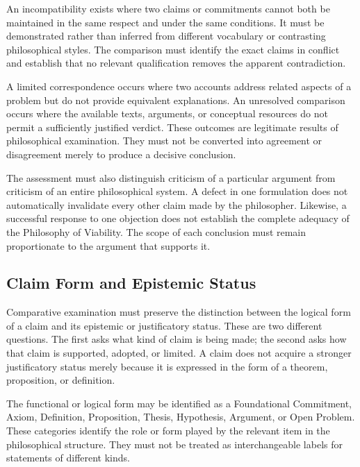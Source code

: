 \label{para:VS.B01.P01.C08.S01.SS06.P004}
An incompatibility exists where two claims or
commitments cannot both be maintained in the same
respect and under the same conditions. It must be
demonstrated rather than inferred from different
vocabulary or contrasting philosophical styles. The
comparison must identify the exact claims in conflict
and establish that no relevant qualification removes
the apparent contradiction.

\label{para:VS.B01.P01.C08.S01.SS06.P005}
A limited correspondence occurs where two accounts
address related aspects of a problem but do not provide
equivalent explanations. An unresolved comparison occurs
where the available texts, arguments, or conceptual
resources do not permit a sufficiently justified
verdict. These outcomes are legitimate results of
philosophical examination. They must not be converted
into agreement or disagreement merely to produce a
decisive conclusion.

\label{para:VS.B01.P01.C08.S01.SS06.P006}
The assessment must also distinguish criticism of a
particular argument from criticism of an entire
philosophical system. A defect in one formulation does
not automatically invalidate every other claim made
by the philosopher. Likewise, a successful response
to one objection does not establish the complete
adequacy of the Philosophy of Viability. The scope of
each conclusion must remain proportionate to the
argument that supports it.

\subsection{Claim Form and Epistemic Status}
\label{sec:ch08-s01-ss07}

\label{para:VS.B01.P01.C08.S01.SS07.P001}
Comparative examination must preserve the distinction
between the logical form of a claim and its epistemic
or justificatory status. These are two different
questions. The first asks what kind of claim is being
made; the second asks how that claim is supported,
adopted, or limited. A claim does not acquire a stronger
justificatory status merely because it is expressed in
the form of a theorem, proposition, or definition.

\label{para:VS.B01.P01.C08.S01.SS07.P002}
The functional or logical form may be identified as a
Foundational Commitment, Axiom, Definition,
Proposition, Thesis, Hypothesis, Argument, or Open
Problem. These categories identify the role or form
played by the relevant item in the philosophical
structure. They must not be treated as interchangeable
labels for statements of different kinds.

